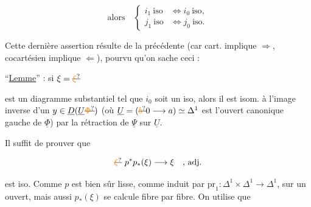 


\[
\text{alors}\quad
\left\{\begin{aligned}i_1\ \text{iso}&\Longleftrightarrow i_0\ \text{iso},\\
j_1\ \text{iso}&\Longleftrightarrow j_0\ \text{iso}.\end{aligned}\right.
\]

Cette dernière assertion résulte de la précédente (car cart. implique $\Rightarrow$, cocartésien implique $\Leftarrow$), pourvu qu'on sache ceci :

``\uline{Lemme}''  : si $\xi=\deleted{\unsure{\xi}}$


est un diagramme substantiel tel que $i_0$ soit un iso, alors il est isom. à l'image inverse d'un $y\in\underline D(\underline U\deleted{\unsure{\Phi}})$ (où $\underline U=(\deleted{\unsure{b}}0\longrightarrow a)\simeq\Delta^1$ est l'ouvert canonique gauche de $\underline\Phi$) par la rétraction  de $\underline\Psi$ sur $\underline U$.


Il suffit de prouver que

\[
\deleted{\unsure{\xi}}\ p^*p_*(\xi)\longrightarrow\xi\quad\text{, adj.}
\]

est iso. Comme $p$ est bien sûr lisse, comme induit par $\mathrm{pr}_1\colon\Delta^1\times\Delta^1\longrightarrow\Delta^1$, sur un ouvert, mais aussi  $p_*(\xi)$ se calcule fibre par fibre. On utilise que 

